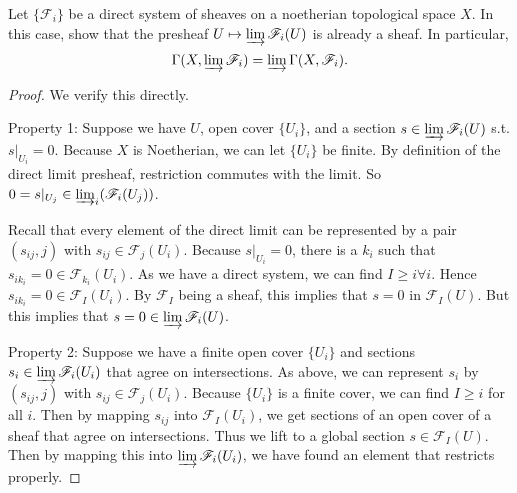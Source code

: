 \begin{exercise}[1.11]
	Let $\{\mathscr{F}_i\}   $ be a direct system of sheaves on a noetherian topological space $X $. In this case, show that the presheaf $U\mapsto \varinjlim \mathscr{F}_i(U)$ is already a sheaf. In particular,
	\[
		\Gamma(X, \varinjlim \mathscr{F}_i) = \varinjlim \Gamma(X,\mathscr{F}_i)
	.\] 
\end{exercise}
\begin{proof}
	We verify this directly.

	Property 1: Suppose we have $U $, open cover $\{U_i\}$, and a section $s \in \varinjlim \mathscr{F}_i(U) $ s.t. $s|_{U_i} = 0 $.
	Because $X $ is Noetherian, we can let $\{U_i\}   $ be finite.
	By definition of the direct limit presheaf, restriction commutes with the limit.
	So $0 = s|_{U_j} \in \varinjlim_i (\mathscr{F}_i(U_j))$.

	Recall that every element of the direct limit can be represented by a pair $(s_{ij}, j) $ with $s_{ij} \in \mathscr{F}_j(U_i) $.
	Because $s|_{U_i} = 0 $, there is a $k_i $ such that $s_{ik_i} = 0 \in \mathscr{F}_{k_i}(U_i) $.
	As we have a direct system, we can find $I \ge i \forall i $.
	Hence $s_{ik_i} = 0 \in \mathscr{F}_I(U_i) $.
	By $\mathscr{F}_I $ being a sheaf, this implies that $s = 0 $ in $\mathscr{F}_I(U) $.
	But this implies that $s = 0 \in \varinjlim \mathscr{F}_i(U) $.
	
	Property 2: Suppose we have a finite open cover $\{U_i\}$ and sections $s_i \in \varinjlim \mathscr{F}_i(U_i)$ that agree on intersections.
	As above, we can represent $s_i $ by $(s_{ij},j) $ with $s_{ij} \in \mathscr{F}_j(U_i) $.
	Because $\{U_i\}   $ is a finite cover, we can find $I \ge i $ for all $i $.
	Then by mapping $s_{ij} $ into $\mathscr{F}_I(U_i) $, we get sections of an open cover of a sheaf that agree on intersections.
	Thus we lift to a global section $s \in \mathscr{F}_I(U)$.
	Then by mapping this into $\varinjlim \mathscr{F}_i(U_i) $, we have found an element that restricts properly.
\end{proof}

